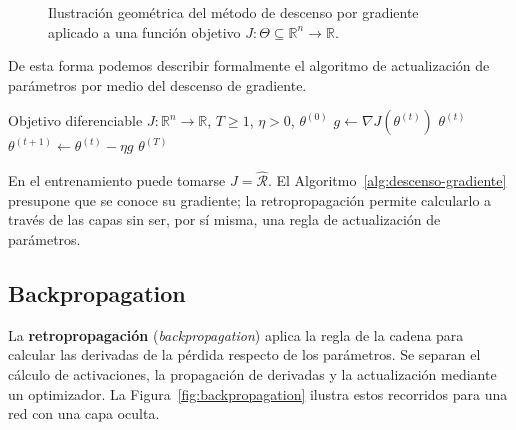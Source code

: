 \begin{figure}[H]
    \caption{Ilustración geométrica del método de descenso por gradiente aplicado a una función objetivo $J : \Theta \subseteq \mathbb{R}^n \to \mathbb{R}$.}
    \label{fig:descenso_gradiente}
\end{figure}

De esta forma podemos describir formalmente el algoritmo de actualización  de parámetros por medio del descenso de gradiente.

\begin{algorithm}[H]
\caption{Actualización por descenso del gradiente}\label{alg:descenso-gradiente}
\begin{algorithmic}[1]
\Require Objetivo diferenciable $J:\mathbb R^n\to\mathbb R$, $T\geq1$, $\eta>0$, $\theta^{(0)}$
    \State $g\gets\nabla J(\theta^{(t)})$
        \State \Return $\theta^{(t)}$
    \EndIf
    \State $\theta^{(t+1)}\gets\theta^{(t)}-\eta g$
\EndFor
\State \Return $\theta^{(T)}$
\end{algorithmic}
\end{algorithm}

En el entrenamiento puede tomarse $J=\widehat{\mathcal R}$. El Algoritmo~\ref{alg:descenso-gradiente} presupone que se conoce su gradiente; la retropropagación permite calcularlo a través de las capas sin ser, por sí misma, una regla de actualización de parámetros.

\subsection{Backpropagation}
La \textbf{retropropagación} (\textit{backpropagation}) aplica la regla de la cadena para calcular las derivadas de la pérdida respecto de los parámetros. Se separan el cálculo de activaciones, la propagación de derivadas y la actualización mediante un optimizador. La Figura~\ref{fig:backpropagation} ilustra estos recorridos para una red con una capa oculta.

